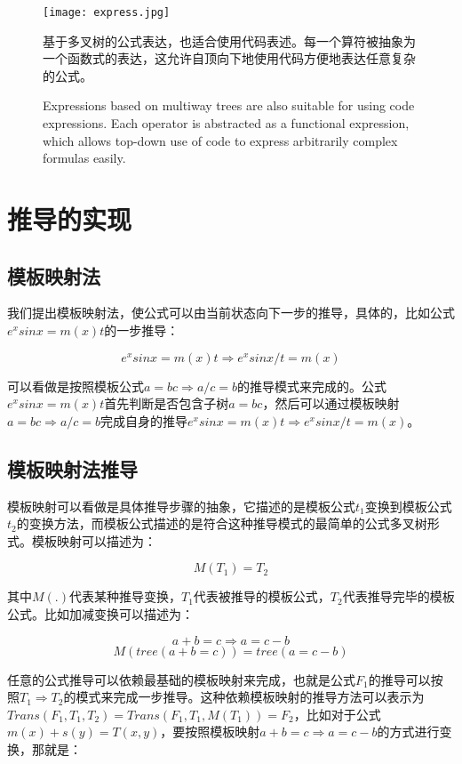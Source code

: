 \documentclass[runningheads]{llncs}
\begin{document}
\begin{figure}[H]
\centering
\texttt{[image: express.jpg]}
\caption{基于多叉树的公式表达，也适合使用代码表述。每一个算符被抽象为一个函数式的表达，这允许自顶向下地使用代码方便地表达任意复杂的公式。}
\caption{Expressions based on multiway trees are also suitable for using code expressions. Each operator is abstracted as a functional expression, which allows top-down use of code to express arbitrarily complex formulas easily.}
\end{figure}









\section{推导的实现}
\subsection{模板映射法}
我们提出模板映射法，使公式可以由当前状态向下一步的推导，具体的，比如公式$e^xsinx=m(x)t$的一步推导：

$$e^xsinx=m(x)t \Rightarrow e^xsinx/t=m(x)$$

可以看做是按照模板公式$a=bc \Rightarrow a/c=b$的推导模式来完成的。公式$e^xsinx=m(x)t$首先判断是否包含子树$a=bc$，然后可以通过模板映射$a=bc \Rightarrow a/c=b$完成自身的推导$e^xsinx=m(x)t \Rightarrow e^xsinx/t=m(x)$。

\subsection{模板映射法推导}
模板映射可以看做是具体推导步骤的抽象，它描述的是模板公式$t_1$变换到模板公式$t_2$的变换方法，而模板公式描述的是符合这种推导模式的最简单的公式多叉树形式。模板映射可以描述为：

$$M(T_1)=T_2$$

其中$M(.)$代表某种推导变换，$T_1$代表被推导的模板公式，$T_2$代表推导完毕的模板公式。比如加减变换可以描述为：

$$a+b=c \Rightarrow a=c-b $$
$$M(tree(a+b=c)) = tree(a=c-b) $$

任意的公式推导可以依赖最基础的模板映射来完成，也就是公式$F_1$的推导可以按照$T_1 \Rightarrow T_2$的模式来完成一步推导。这种依赖模板映射的推导方法可以表示为$Trans(F_1,T_1,T_2)=Trans(F_1,T_1,M(T_1))=F_2$，比如对于公式$m(x)+s(y)=T(x,y)$，要按照模板映射$a+b=c \Rightarrow a=c-b $的方式进行变换，那就是：
\end{document}
